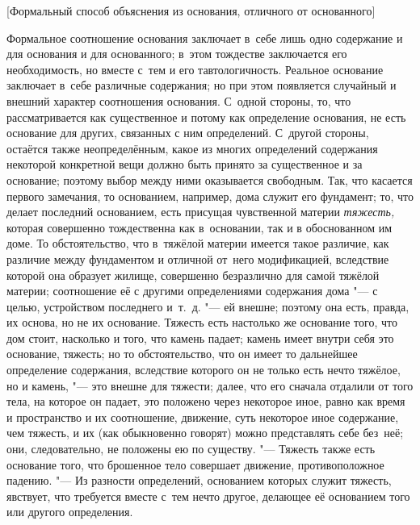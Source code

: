 %
{[Формальный способ объяснения из основания, отличного от основанного]}

Формальное соотношение основания заключает в~себе лишь одно содержание и для
основания и для основанного; в~этом тождестве заключается его необходимость,
но вместе с~тем и его тавтологичность. Реальное основание заключает в~себе
различные содержания; но при этом появляется случайный и внешний характер
соотношения основания. С~одной стороны, то, что рассматривается как
существенное и потому как определение основания, не есть основание для других,
связанных с ним определений. С~другой стороны, остаётся также неопределённым,
какое из многих определений содержания некоторой конкретной вещи должно быть
принято за существенное и за основание; поэтому выбор между ними оказывается
свободным. Так, что касается первого замечания, то основанием, например, дома
служит его фундамент; то, что делает последний основанием, есть присущая
чувственной материи {\em тяжесть,} которая совершенно тождественна как
в~основании, так и в обоснованном им доме. То обстоятельство, что в~тяжёлой
материи имеется такое различие, как различие между фундаментом и отличной
от~него модификацией, вследствие которой она образует жилище, совершенно
безразлично для самой тяжёлой материи; соотношение её с другими определениями
содержания дома "--- с целью, устройством последнего и~т.~д. "--- ей внешне;
поэтому она есть, правда, их основа, но не их основание. Тяжесть есть настолько
же основание того, что дом стоит, насколько и того, что камень падает; камень
имеет внутри себя это основание, тяжесть; но то обстоятельство, что он имеет то
дальнейшее определение содержания, вследствие которого он не только есть нечто
тяжёлое, но и камень, "--- это внешне для тяжести; далее, что его сначала
отдалили от того тела, на которое он падает, это положено через некоторое
иное, равно как время и пространство и их соотношение, движение, суть
некоторое иное содержание, чем тяжесть, и их (как обыкновенно говорят) можно
представлять себе без~неё; они, следовательно, не положены ею по существу. "---
Тяжесть также есть основание того, что брошенное тело совершает движение,
противоположное падению. "--- Из разности определений, основанием которых
служит тяжесть, явствует, что требуется вместе с~тем нечто другое, делающее
её основанием того или другого определения.

